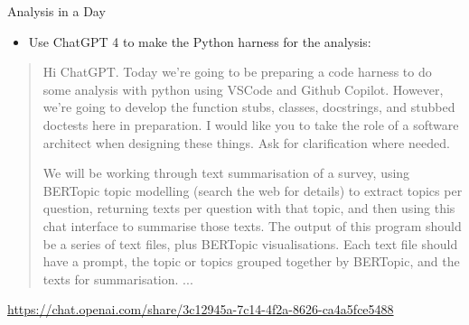 \documentclass[xcolor={dvipsnames},aspectratio=169]{beamer}
\begin{document}
\begin{frame}{Analysis in a Day}
\begin{itemize}
    \item Use ChatGPT 4 to make the Python harness for the analysis:
\end{itemize}
\begin{quote}
    Hi ChatGPT. Today we're going to be preparing a code harness to do some analysis with python using VSCode and Github Copilot. However, we're going to develop the function stubs, classes, docstrings, and stubbed doctests here in preparation. I would like you to take the role of a software architect when designing these things. Ask for clarification where needed.

We will be working through text summarisation of a survey, using BERTopic topic modelling (search the web for details) to extract topics per question, returning texts per question with that topic, and then using this chat interface to summarise those texts. The output of this program should be a series of text files, plus BERTopic visualisations. Each text file should have a prompt, the topic or topics grouped together by BERTopic, and the texts for summarisation. ...
\end{quote}
{\tiny \url{https://chat.openai.com/share/3c12945a-7c14-4f2a-8626-ca4a5fce5488}}    
\end{frame}
\end{document}
